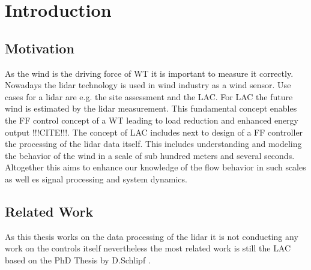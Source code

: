 \chapter{Introduction} \label{cha:INT}
\section{Motivation}\label{sec:Mot}
As the wind is the driving force of \gls{WT} it is important to measure it correctly. Nowadays the \gls{lidar} technology is used in wind industry as a wind sensor. Use cases for a \gls{lidar} are e.g. the site assessment and the \gls{LAC}. For \gls{LAC} the future wind is estimated by the \gls{lidar} measurement. This fundamental concept enables the \gls{FF} control concept of a \gls{WT} leading to load reduction and enhanced energy output !!!CITE!!!. The concept of \gls{LAC} includes next to design of a \gls{FF} controller the processing of the \gls{lidar} data itself. This includes understanding and modeling the behavior of the wind in a scale of sub hundred meters and several seconds. Altogether this aims to enhance our knowledge of the flow behavior in such scales as well es signal processing and system dynamics.

\section{Related Work}\label{sec:RelWork}
As this thesis works on the data processing of the \gls{lidar} it is not conducting any work on the controls itself nevertheless the most related work is still the \gls{LAC} based on the PhD Thesis by D.Schlipf \cite{Schlipf2015}.  